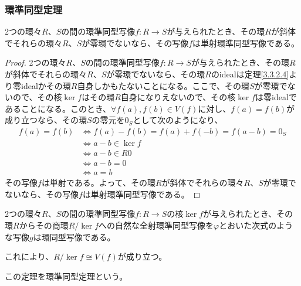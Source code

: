 \documentclass[dvipdfmx]{jsarticle}
\begin{document}
\subsubsection{環準同型定理}%
\begin{thm}\label{3.3.2.20}
2つの環々$R$、$S$の間の環準同型写像$f:R \rightarrow S$が与えられたとき、その環$R$が斜体でそれらの環々$R$、$S$が零環でないなら、その写像$f$は単射環準同型写像である。
\end{thm}
\begin{proof}
2つの環々$R$、$S$の間の環準同型写像$f:R \rightarrow S$が与えられたとき、その環$R$が斜体でそれらの環々$R$、$S$が零環でないなら、その環$R$のidealは定理\ref{3.3.2.4}より零idealかその環$R$自身しかもたないことになる。ここで、その環$S$が零環でないので、その核$\ker f$はその環$R$自身になりえないので、その核$\ker f$は零idealであることになる。このとき、$\forall f(a),f(b) \in V(f)$に対し、$f(a) = f(b)$が成り立つなら、その環$S$の零元を$0_{S}$として次のようになり、
\begin{align*}
f(a) = f(b) &\Leftrightarrow f(a) - f(b) = f(a) + f( - b) = f(a - b) = 0_{S}\\
&\Leftrightarrow a - b \in \ker f\\
&\Leftrightarrow a - b \in R0\\
&\Leftrightarrow a - b = 0\\
&\Leftrightarrow a = b
\end{align*}
その写像$f$は単射である。よって、その環$R$が斜体でそれらの環々$R$、$S$が零環でないなら、その写像$f$は単射環準同型写像である。
\end{proof}
\begin{thm}[環準同型定理]\label{3.3.2.21}
2つの環々$R$、$S$の間の環準同型写像$f:R \rightarrow S$の核$\ker f$が与えられたとき、その環$R$からその商環${R}/{\ker f}$への自然な全射環準同型写像を$\varphi$とおいた次式のような写像$g$は環同型写像である。
\begin{center}
\end{center}
これにより、${R}/{\ker f} \cong V(f)$が成り立つ。\par
この定理を環準同型定理という。
\end{thm}
\end{document}
